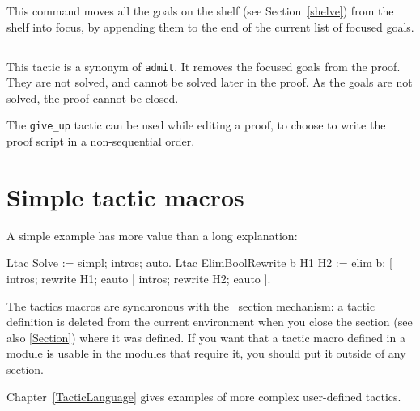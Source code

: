 This command moves all the goals on the shelf (see Section~\ref{shelve}) from the
shelf into focus, by appending them to the end of the current list of focused goals.

\subsection[\tt give\_up]{}

This tactic is a synonym of {\tt admit}. It removes the focused goals from the proof. They are not solved, and cannot
be solved later in the proof. As the goals are not solved, the proof cannot be closed.

The {\tt give\_up} tactic can be used while editing a proof, to choose to write the
proof script in a non-sequential order.

\section{Simple tactic macros}
\label{TacticDefinition}

A simple example has more value than a long explanation:

\begin{coq_example}
Ltac Solve := simpl; intros; auto.
Ltac ElimBoolRewrite b H1 H2 :=
  elim b; [ intros; rewrite H1; eauto | intros; rewrite H2; eauto ].
\end{coq_example}

The tactics macros are synchronous with the \Coq\ section mechanism:
a tactic definition is deleted from the current environment
when you close the section (see also \ref{Section})
where it was defined. If you want that a
tactic macro defined in a module is usable in the modules that
require it, you should put it outside of any section.

Chapter~\ref{TacticLanguage} gives examples of more complex
user-defined tactics.


